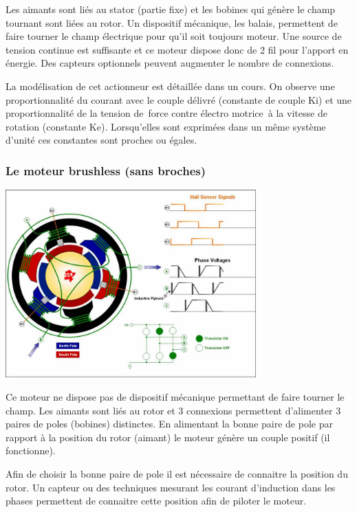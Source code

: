 Les aimants sont liés au stator (partie fixe) et les bobines qui génère
le champ tournant sont liées au rotor. Un dispositif mécanique, les
balais, permettent de faire tourner le champ électrique pour qu'il soit
toujours moteur. Une source de tension continue est suffisante et ce
moteur dispose donc de 2 fil pour l'apport en énergie. Des capteurs
optionnels peuvent augmenter le nombre de connexions.

La modélisation de cet actionneur est détaillée dans un cours. On
observe une proportionnalité du courant avec le couple délivré
(constante de couple Ki) et une proportionnalité de la tension de~force
contre électro motrice~à la vitesse de rotation (constante Ke).
Lorsqu'elles sont exprimées dans un même système d'unité ces constantes
sont proches ou égales.

\subsubsection{Le moteur brushless (sans broches)}

\begin{center}
\includegraphics[width=3.79554in,height=2.84745in]{media/image71.jpeg} 
\end{center}

Ce moteur ne dispose pas de dispositif mécanique permettant de faire
tourner le champ. Les aimants sont liés au rotor et 3 connexions
permettent d'alimenter 3 paires de poles (bobines) distinctes. En
alimentant la bonne paire de pole par rapport à la position du rotor
(aimant) le moteur génère un couple positif (il fonctionne).

Afin de choisir la bonne paire de pole il est nécessaire de connaitre la
position du rotor. Un capteur ou des techniques mesurant les courant
d'induction dans les phases permettent de connaitre cette position afin
de piloter le moteur.

